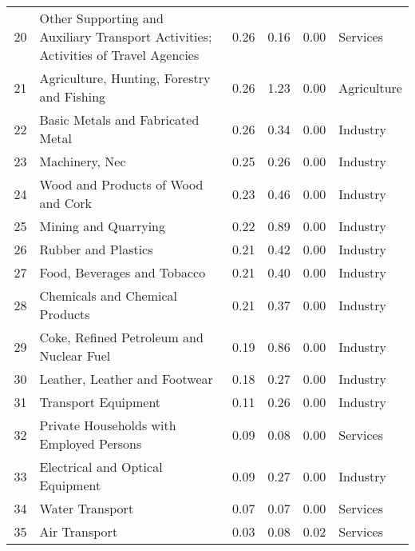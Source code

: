 \begin{table}[ht]
\begin{tabular}{rlrrrl}
$$  20 & Other Supporting and Auxiliary Transport Activities; Activities of Travel Agencies & 0.26 & 0.16 & 0.00 & Services \\ 
  21 & Agriculture, Hunting, Forestry and Fishing & 0.26 & 1.23 & 0.00 & Agriculture \\ 
  22 & Basic Metals and Fabricated Metal & 0.26 & 0.34 & 0.00 & Industry \\ 
  23 & Machinery, Nec & 0.25 & 0.26 & 0.00 & Industry \\ 
  24 & Wood and Products of Wood and Cork & 0.23 & 0.46 & 0.00 & Industry \\ 
  25 & Mining and Quarrying & 0.22 & 0.89 & 0.00 & Industry \\ 
  26 & Rubber and Plastics & 0.21 & 0.42 & 0.00 & Industry \\ 
  27 & Food, Beverages and Tobacco & 0.21 & 0.40 & 0.00 & Industry \\ 
  28 & Chemicals and Chemical Products & 0.21 & 0.37 & 0.00 & Industry \\ 
  29 & Coke, Refined Petroleum and Nuclear Fuel & 0.19 & 0.86 & 0.00 & Industry \\ 
  30 & Leather, Leather and Footwear & 0.18 & 0.27 & 0.00 & Industry \\ 
  31 & Transport Equipment & 0.11 & 0.26 & 0.00 & Industry \\ 
  32 & Private Households with Employed Persons & 0.09 & 0.08 & 0.00 & Services \\ 
  33 & Electrical and Optical Equipment & 0.09 & 0.27 & 0.00 & Industry \\ 
  34 & Water Transport & 0.07 & 0.07 & 0.00 & Services \\ 
  35 & Air Transport & 0.03 & 0.08 & 0.02 & Services \\ 
   \hline
\end{tabular}
\end{table}
